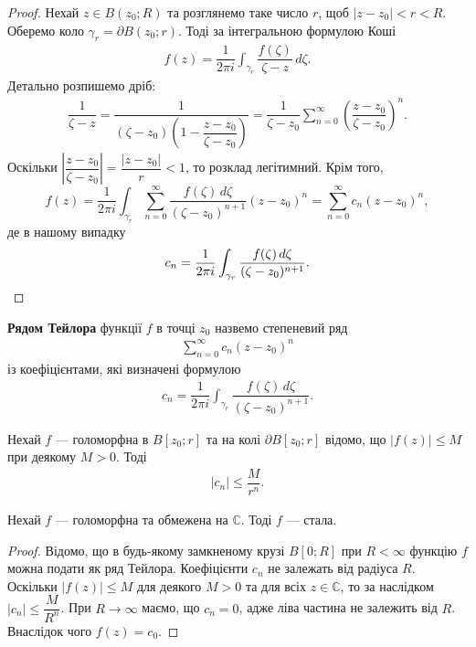 \documentclass{math_library}
\begin{document}
\begin{proof}
Нехай $z \in B(z_0;R)$ та розглянемо таке число $r$, щоб $|z-z_0| < r < R$. Оберемо коло $\gamma_r = \partial B(z_0;r)$. Тоді за інтегральною формулою Коші
\begin{align*}
f(z) = \dfrac{1}{2\pi i} \int_{\gamma_r} \dfrac{f(\zeta)}{\zeta - z}\,d\zeta.
\end{align*}
Детально розпишемо дріб:
\begin{align*}
\dfrac{1}{\zeta - z} = \dfrac{1}{(\zeta-z_0) \left( 1 - \dfrac{z-z_0}{\zeta - z_0} \right)} = \dfrac{1}{\zeta-z_0} \sum_{n=0}^\infty \left( \dfrac{z-z_0}{\zeta-z_0} \right)^n.
\end{align*}
Оскільки $\left| \dfrac{z-z_0}{\zeta-z_0} \right| = \dfrac{|z-z_0|}{r} < 1$, то розклад легітимний. Крім того,
\[
f(z) = \dfrac{1}{2\pi i} \int_{\gamma_r} \sum_{n=0}^\infty \dfrac{f(\zeta)\,d\zeta}{(\zeta-z_0)^{n+1}} (z-z_0)^n = \sum_{n=0}^{\infty} c_n(z-z_0)^n,
\]
де в нашому випадку
\[
c_n = \dfrac{1}{2\pi i} \int_{\gamma_r} \dfrac{f(\zeta)\,d\zeta}{(\zeta-z_0)^{n+1}}. \qedhere
\]
\end{proof}

\begin{definition}
\textbf{Рядом Тейлора} функції $f$ в точці $z_0$ назвемо степеневий ряд
\begin{align*}
\sum_{n=0}^\infty c_n(z-z_0)^n
\end{align*}
із коефіцієнтами, які визначені формулою
\begin{align*}
c_n = \dfrac{1}{2\pi i} \int_{\gamma_r} \dfrac{f(\zeta)\,d\zeta}{(\zeta-z_0)^{n+1}}.
\end{align*}
\end{definition}

\begin{corollary}
Нехай $f$ --- голоморфна в $B[z_0;r]$ та на колі $\partial B[z_0;r]$ відомо, що $|f(z)| \leq M$ при деякому $M > 0$. Тоді
\begin{align*}
|c_n| \leq \dfrac{M}{r^n}.
\end{align*}
\end{corollary}

\begin{theorem}
Нехай $f$ --- голоморфна та обмежена на $\mathbb{C}$. Тоді $f$ --- стала.
\end{theorem}

\begin{proof}
Відомо, що в будь-якому замкненому крузі $B[0;R]$ при $R<\infty$ функцію $f$ можна подати як ряд Тейлора. Коефіцієнти $c_n$ не залежать від радіуса $R$. Оскільки $|f(z)| \leq M$ для деякого $M > 0$ та для всіх $z \in \mathbb{C}$, то за наслідком $|c_n| \leq \dfrac{M}{R^n}$. При $R \to \infty$ маємо, що $c_n = 0$, адже ліва частина не залежить від $R$. Внаслідок чого $f(z) = c_0$.
\end{proof}
\end{document}
